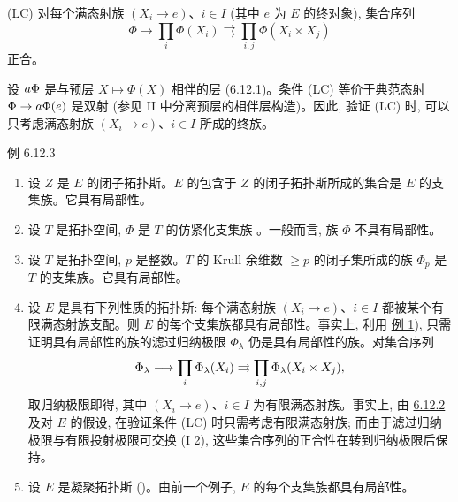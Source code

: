 \noindent
(LC) 对每个满态射族 $(X_i\to e)$、$i\in I$ (其中 $e$ 为 $E$ 的终对象), 集合序列
$$
\Phi\to\prod_i\Phi(X_i)\rightrightarrows
\prod_{i,j}\Phi(X_i\times X_j)
$$
正合。

设 ${a\Phi}$ 是与预层 $X\longmapsto\Phi(X)$ 相伴的层 (\hyperref[V.subsubsec6.12.1]{6.12.1})。条件 (LC) 等价于典范态射 $\Phi\to\vieuxsheaf{a\Phi}(e)$ 是\pageoriginale 双射 (参见 II 中分离预层的相伴层构造)。因此, 验证 (LC) 时, 可以只考虑满态射族 $(X_i\to e)$、$i\in I$ 所成的终族。

\begin{enonce*}[remark]{例 6.12.3}
\begin{enumerate}
\renewcommand{\labelenumi}{\theenumi)}
\hypertarget{sga4.exp.V.example.6.12.3.item.1}{}\item 设 $Z$ 是 $E$ 的闭子拓扑斯。$E$ 的包含于 $Z$ 的闭子拓扑斯所成的集合是 $E$ 的支集族。它具有局部性。

\item 设 $T$ 是拓扑空间, $\Phi$ 是 $T$ 的仿紧化支集族 \cite{sga4.exp.V.bib.7}。一般而言, 族 $\Phi$ 不具有局部性。

\item 设 $T$ 是拓扑空间, $p$ 是整数。$T$ 的 Krull 余维数 $\geq p$ 的闭子集所成的族 $\Phi_p$ 是 $T$ 的支集族。它具有局部性。

\item 设 $E$ 是具有下列性质的拓扑斯: 每个满态射族 $(X_i\to e)$、$i\in I$ 都被某个有限满态射族支配。则 $E$ 的每个支集族都具有局部性。事实上, 利用 \hyperlink{sga4.exp.V.example.6.12.3.item.1}{例 1}), 只需证明具有局部性的族的滤过归纳极限 $\Phi_\lambda$ 仍是具有局部性的族。对集合序列
$$
\Phi_\lambda\to\prod_i\Phi_\lambda(X_i)
\rightrightarrows\prod_{i,j}\Phi_\lambda(X_i\times X_j){\quoi},
$$
取归纳极限即得, 其中 $(X_i\to e)$、$i\in I$ 为有限满态射族。事实上, 由 \hyperref[V.subsubsec6.12.2]{6.12.2} 及对 $E$ 的假设, 在验证条件 (LC) 时只需考虑有限满态射族; 而由于滤过归纳极限与有限投射极限可交换 (I 2), 这些集合序列的正合性在转到归纳极限后保持。

\item 设 $E$ 是凝聚拓扑斯 ()。由前一个例子, $E$ 的每个支集族都具有局部性。
\end{enumerate}
\end{enonce*}

\setcounter{subsection}{12}
